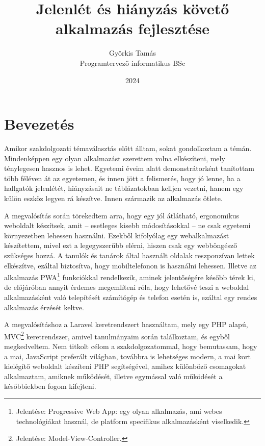\documentclass[
]{thesis-ekf}
\theoremstyle{definition}
\theoremstyle{remark}
\begin{document}
\title{Jelenlét és hiányzás követő alkalmazás fejlesztése}
\author{Györkis Tamás\\Programtervező informatikus BSc}
\date{2024}
\maketitle
\tableofcontents

\chapter*{Bevezetés}
Amikor szakdolgozati témaválasztás előtt álltam, sokat gondolkoztam a témán. Mindenképpen egy olyan alkalmazást szerettem volna elkészíteni, mely ténylegesen hasznos is lehet. Egyetemi éveim alatt demonstrátorként tanítottam több féléven át az egyetemen, és innen jött a felismerés, hogy jó lenne, ha a hallgatók jelenlétét, hiányzásait ne táblázatokban kelljen vezetni, hanem egy külön eszköz legyen rá készítve. Innen származik az alkalmazás ötlete.

A megvalósítás során törekedtem arra, hogy egy jól átlátható, ergonomikus weboldalt készítsek, amit -- esetleges kisebb módosításokkal -- ne csak egyetemi környezetben lehessen használni. Ezekből kifolyólag egy webalkalmazást készítettem, mivel ezt a legegyszerűbb elérni, hiszen csak egy webböngésző szükséges hozzá. A tanulók és tanárok által használt oldalak reszponzívan lettek elkészítve, ezáltal biztosítva, hogy mobiltelefonon is használni lehessen. Illetve az alkalmazás PWA\footnote{Jelentése: Progressive Web App: egy olyan alkalmazás, ami webes technológiákat használ, de platform specifikus alkalmazásként viselkedik.\cite{PWA}}  funkciókkal rendelkezik, aminek jelentőségére később térek ki, de előjáróban annyit érdemes megemlíteni róla, hogy lehetővé teszi a weboldal alkalmazásként való telepítését számítógép és telefon esetén is, ezáltal egy rendes alkalmazás érzését keltve.

A megvalósításhoz a Laravel keretrendszert használtam, mely egy PHP alapú, MVC\footnote{Jelentése: Model-View-Controller.\cite{mvc}} keretrendszer, amivel tanulmányaim során találkoztam, és egyből megkedveltem. Nem titkolt célom a szakdolgozatommal, hogy bemutassam, hogy a mai, JavaScript preferált világban, továbbra is lehetséges modern, a mai kort kielégítő weboldalt készíteni PHP segítségével, amihez különböző csomagokat alkalmaztam, amiknek működését, illetve egymással való működését a későbbiekben fogom kifejteni.
\end{document}
